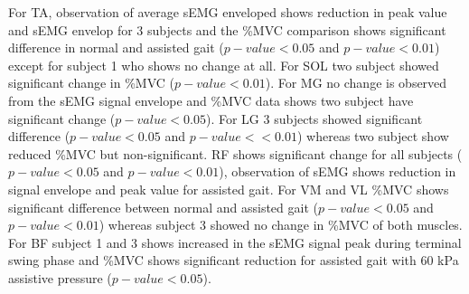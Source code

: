 \documentclass[letterpaper, 10 pt, conference]{ieeeconf}  %
\begin{document}
For TA, observation of average sEMG enveloped shows reduction in peak value and sEMG envelop for 3 subjects and the \%MVC comparison shows significant difference in normal and assisted gait ($p-value < 0.05$ and $p-value < 0.01$) except for subject 1 who shows no change at all. For SOL two subject showed significant change in \%MVC ($p-value < 0.01$). For MG no change is observed from the sEMG signal envelope and \%MVC data shows two subject have significant change ($p-value < 0.05$). For LG 3 subjects showed significant difference ($p-value < 0.05$ and $p-value < <0.01$) whereas two subject show reduced \%MVC but non-significant. RF shows significant change for all subjects ($p-value < 0.05$ and $p-value < 0.01$), observation of sEMG shows reduction in signal envelope and peak value for assisted gait. For VM and VL \%MVC shows significant difference between normal and assisted gait ($p-value < 0.05$ and $p-value < 0.01$) whereas subject 3 showed no change in \%MVC of both muscles. For BF subject 1 and 3 shows increased in the sEMG signal peak during terminal swing phase and \%MVC shows significant reduction for assisted gait with 60 kPa assistive pressure ($p-value < 0.05$).
\end{document}
